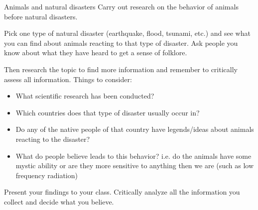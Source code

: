             \begin{project}{Animals and natural disasters}
            \nopagebreak
        \label{m38779*id1164119615164}Carry out research on the behavior of animals before natural disasters. \par 
        \label{m38779*id1164121934705}Pick one type of natural disaster (earthquake, flood, tsunami, etc.) and see what you can find about animals reacting to that type of disaster. Ask people you know about what they have heard to get a sense of folklore.\par 
        \label{m38779*id1164121037612}Then research the topic to find more information and remember to critically assess all information. Things to consider:\par 
        \label{m38779*id1164128014077}\begin{itemize}[noitemsep]
            \item What scientific research has been conducted? \item Which countries does that type of disaster usually occur in?\item Do any of the native people of that country have legends/ideas about animals reacting to the disaster? \item What do people believe leads to this behavior? i.e. do the animals have some mystic ability or are they more sensitive to anything then we are (such as low frequency radiation)\end{itemize}
        \label{m38779*id1164121076422}Present your findings to your class. Critically analyze all the information you collect and decide what you believe. \par 
      \label{m38779*cid9}
      \end{project}

